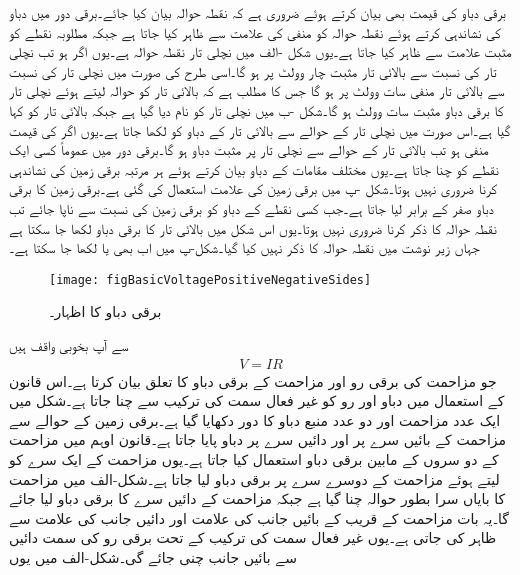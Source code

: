 برقی دباو کی قیمت بھی بیان کرتے ہوئے ضروری ہے کہ نقطہ حوالہ بیان کیا جائے۔برقی دور میں دباو کی نشاندہی کرتے ہوئے نقطہ حوالہ کو منفی کی علامت  سے ظاہر کیا جاتا ہے جبکہ مطلوبہ نقطے کو مثبت علامت  سے ظاہر کیا جاتا ہے۔یوں شکل -الف میں نچلی تار نقطہ حوالہ ہے۔یوں اگر  ہو تب نچلی تار کی نسبت سے بالائی تار مثبت چار وولٹ پر ہو گا۔اسی طرح  کی صورت میں نچلی تار کی نسبت سے بالائی تار منفی سات وولٹ پر ہو گا جس کا مطلب ہے کہ بالائی تار کو حوالہ لیتے ہوئے نچلی تار کا برقی دباو مثبت سات وولٹ ہو گا۔شکل  -ب میں نچلی تار کو  نام دیا گیا ہے جبکہ بالائی تار کو  کہا گیا ہے۔اس صورت میں نچلی تار کے حوالے سے بالائی تار کے دباو کو  لکھا جاتا ہے۔یوں اگر  کی قیمت منفی ہو تب بالائی تار کے حوالے سے نچلی تار پر مثبت دباو ہو گا۔برقی دور میں عموماً کسی ایک نقطے کو  چنا جاتا ہے۔یوں مختلف مقامات کے دباو بیان کرتے ہوئے ہر مرتبہ برقی زمین کی نشاندہی کرنا ضروری نہیں ہوتا۔شکل -پ میں برقی زمین کی علامت استعمال کی گئی ہے۔برقی زمین کا برقی دباو صفر کے برابر لیا جاتا ہے۔جب کسی نقطے کے دباو کو برقی زمین کی نسبت سے ناپا جائے تب نقطہ حوالہ کا ذکر کرنا ضروری نہیں ہوتا۔یوں اس شکل میں بالائی تار کا برقی دباو  لکھا جا سکتا ہے  جہاں زیر نوشت میں نقطہ حوالہ کا ذکر نہیں کیا گیا۔شکل-پ میں اب بھی  یا  لکھا جا سکتا ہے۔
\begin{figure}
\centering
\texttt{[image: figBasicVoltagePositiveNegativeSides]}
\caption{برقی دباو کا اظہار۔}
\label{شکل_بنیادی_دباو_کا_اظہار}
\end{figure}
%
 سے آپ بخوبی واقف ہیں
\begin{align}
V=I R
\end{align}
جو مزاحمت کی برقی رو اور مزاحمت کے برقی دباو کا تعلق بیان کرتا ہے۔اس قانون کے استعمال میں دباو  اور رو  کو غیر فعال سمت کی ترکیب سے چنا جاتا ہے۔شکل  میں ایک عدد مزاحمت اور دو عدد منبع دباو کا دور دکھایا گیا ہے۔برقی زمین کے حوالے سے مزاحمت کے بائیں سرے پر  اور دائیں سرے پر  دباو پایا جاتا ہے۔قانون اوہم میں مزاحمت کے دو سروں کے مابین برقی دباو استعمال کیا جاتا ہے۔یوں مزاحمت کے ایک سرے کو  لیتے ہوئے مزاحمت کے دوسرے سرے پر برقی دباو لیا جاتا ہے۔شکل-الف میں مزاحمت کا بایاں سرا بطور حوالہ چنا گیا ہے جبکہ مزاحمت کے دائیں سرے کا برقی دباو لیا جائے گا۔یہ بات مزاحمت کے قریب  کے بائیں جانب  کی علامت اور دائیں جانب   کی علامت سے ظاہر کی جاتی ہے۔یوں غیر فعال سمت کی ترکیب کے تحت برقی رو کی سمت دائیں سے بائیں جانب چنی جائے گی۔شکل-الف میں یوں
